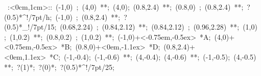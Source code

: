 %

\hbox{
\xy    <1cm,0cm>:<0cm,1cm>::
       (-1,0) ; (4,0) **\dir{-};
       (4,0); (0.8,2.4) **\dir{-};  
       (0.8,0) ; (0.8,2.4) **\dir{-};  ?(0.5)*^!/7pt/{h};
       (-1,0) ; (0.8,2.4) **\dir{-};   ?(0.5)*_!/7pt/{15};
       (0.68,2.24) ; (0.84,2.12) **\dir{-};  
       (0.84,2.12) ; (0.96,2.28) **\dir{-};  
       (1,0) ; (1,0.2) **\dir{-};  
       (0.8,0.2) ; (1,0.2) **\dir{-};  %
       (-1,0)+<-0.75em,-0.5ex> *{A};
       (4,0)+<0.75em,-0.5ex> *{B};
       (0.8,0)+<0em,-1.1ex> *{D};
       (0.8,2.4)+<0em,1.1ex> *{C};
       (-1,-0.4); (-1,-0.6) **\dir{-};  
       (4,-0.4); (4,-0.6) **\dir{-};  
       (-1,-0.5); (4,-0.5)  **\dir{-}; 
       ?(1)*\dir{>}; ?(0)*\dir{<}; ?(0.5)*^!/7pt/{25};
       \endxy}
	   

